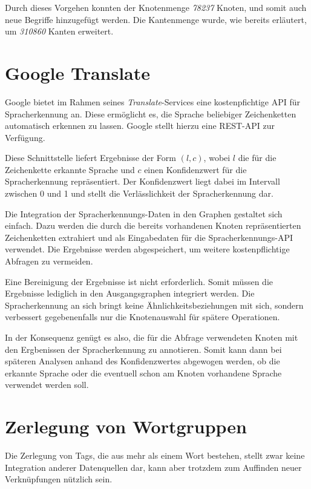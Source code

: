 Durch dieses Vorgehen konnten der Knotenmenge \emph{78237} Knoten, und somit auch neue Begriffe hinzugefügt werden. Die Kantenmenge wurde, wie bereits erläutert, um \emph{310860} Kanten erweitert.

\section{Google Translate}

Google bietet im Rahmen seines \emph{Translate}-Services \cite{gt2013} eine kostenpfichtige API für Spracherkennung an. Diese ermöglicht es, die Sprache beliebiger Zeichenketten automatisch erkennen zu lassen. Google stellt hierzu eine REST-API zur Verfügung.

Diese Schnittstelle liefert Ergebnisse der Form \((l, c)\), wobei \(l\) die für die Zeichenkette erkannte Sprache und \(c\) einen Konfidenzwert für die Spracherkennung repräsentiert. Der Konfidenzwert liegt dabei im Intervall zwischen \num{0} und \num{1} und stellt die Verlässlichkeit der Spracherkennung dar.

Die Integration der Spracherkennungs-Daten in den Graphen gestaltet sich einfach. Dazu werden die durch die bereits vorhandenen Knoten repräsentierten Zeichenketten extrahiert und als Eingabedaten für die Spracherkennungs-API verwendet. Die Ergebnisse werden abgespeichert, um weitere kostenpflichtige Abfragen zu vermeiden.

Eine Bereinigung der Ergebnisse ist nicht erforderlich. Somit müssen die Ergebnisse lediglich in den Ausgangsgraphen integriert werden. Die Spracherkennung an sich bringt keine Ähnlichkeitsbeziehungen mit sich, sondern verbessert gegebenenfalls nur die Knotenauswahl für spätere Operationen.

In der Konsequenz genügt es also, die für die Abfrage verwendeten Knoten mit den Ergbenissen der Spracherkennung zu annotieren. Somit kann dann bei späteren Analysen anhand des Konfidenzwertes abgewogen werden, ob die erkannte Sprache oder die eventuell schon am Knoten vorhandene Sprache verwendet werden soll.

\section{Zerlegung von Wortgruppen}

Die Zerlegung von Tags, die aus mehr als einem Wort bestehen, stellt zwar keine Integration anderer Datenquellen dar, kann aber trotzdem zum Auffinden neuer Verknüpfungen nützlich sein.

